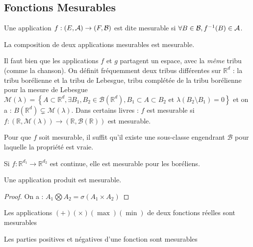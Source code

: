 \documentclass{cours}
\begin{document}
\subsection{Fonctions Mesurables}
\begin{definition}
    Une application $f : \left(E, \mathcal{A}\right) \rightarrow (F, \mathcal{B})$ est dite mesurable si $\forall B \in \mathcal{B}, f^{-1}(B) \in \mathcal{A}$.
\end{definition}
\begin{theorem}
    La composition de deux applications mesurables est mesurable.
\end{theorem}
\begin{remark}
    Il faut bien que les applications $f$ et $g$ partagent un espace, avec la \emph{même} tribu (comme la chanson).
    On définit fréquemment deux tribus différentes sur $\mathbb{R}^{d}$ : la tribu borélienne et la tribu de Lebesgue, tribu complétée de la tribu borélienne pour la mesure de Lebesgue $\mathcal{M}(\lambda) = \left\{A \subset \mathbb{R}^{d}, \exists B_{1}, B_{2} \in \mathcal{B}(\mathbb{R}^{d}), B_1 \subset A \subset B_2 \text{ et } \lambda(B_2 \setminus B_1) = 0 \right\}$
    et on a : $B(\mathbb{R}^{d}) \subsetneq \mathcal{M}(\lambda)$. Dans certains livres : $f$ est mesurable si $f : \left(\mathbb{R}, \mathcal{M}(\lambda)\right) \rightarrow \left(\mathbb{R}, \mathcal{B}(\mathbb{R})\right)$ est mesurable.
\end{remark}
\begin{proposition}
    Pour que $f$ soit mesurable, il suffit qu'il existe une sous-classe engendrant $\mathcal{B}$ pour laquelle la propriété est vraie.
\end{proposition}
\begin{corollary}
    Si $f : \mathbb{R}^{d_1} \rightarrow\mathbb{R}^{d_2}$ est continue, elle est mesurable pour les boréliens.
\end{corollary}
\begin{corollary}
    Une application produit est mesurable.
\end{corollary}
\begin{proof}
    On a : $A_{1} \bigotimes A_{2} = \sigma\left(A_{1} \times A_{2}\right)$
\end{proof}
\begin{lemma}
    Les applications $(+) (\times) (\max) (\min)$ de deux fonctions réelles sont mesurables
\end{lemma}
\begin{corollary}
    Les parties positives et négatives d'une fonction sont mesurables
\end{corollary}
\end{document}
